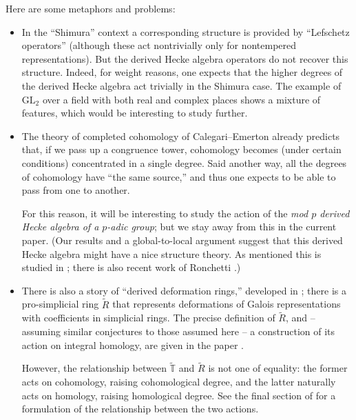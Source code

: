 \documentclass[10pt]{amsart}
\newcommand{\gHecke}{\tilde{\mathbb{T}}}
\newcommand{\GL}{\mathrm{GL}}
\theoremstyle{remark}
\begin{document}
 Here are some metaphors and problems:
\begin{itemize}
\item[(a)]
In the ``Shimura'' context a corresponding structure is provided by ``Lefschetz operators'' (although these act nontrivially
only for nontempered representations). 
But the derived Hecke algebra operators do not recover this structure. Indeed, for weight reasons, 
one expects that the higher degrees of the derived Hecke algebra act trivially in the Shimura case. 
The example of  $\GL_2$ over a field with both real and complex places shows a mixture of features, which would be interesting to study further. 
  
%
%
%
%

 \item[(b)] The theory of completed cohomology of Calegari--Emerton \cite{CE} already predicts that, if we pass up a congruence tower,
cohomology becomes (under certain conditions) concentrated in a single degree. Said another way,
all the degrees of cohomology have ``the same source,'' and thus one expects to be able to pass from one to another. 

For this reason, it will be interesting to study the action of the {\em mod $p$ derived Hecke algebra of a {\em $p$-adic group}}; but
we stay away from this in the current paper.   (Our results and a global-to-local argument suggest that 
 this derived Hecke algebra might have a nice structure theory.  As mentioned this is studied in \cite{Schneider, SchneiderOllivier}; there is also recent work of Ronchetti \cite{Ronchetti}.) 



%
%
%
%
 
 
 \item[(c)] There is also a   story of ``derived deformation rings,'' developed in \cite{GV};
 there is a pro-simplicial ring $\tilde{R}$ that represents deformations of Galois representations with coefficients in 
 simplicial rings.    
The precise definition of $\tilde{R}$, and -- assuming similar conjectures
to those assumed here --   a construction of its action on integral homology, are given in the paper \cite{GV}.
 
 However, the relationship between $\gHecke$ and $\tilde{R}$
is not one of equality: the former acts on cohomology, raising cohomological degree,
and the latter naturally acts on homology, raising homological degree. See the final section of \cite{GV} for  
a formulation of the relationship between the two actions. 


\end{itemize}
\end{document}
